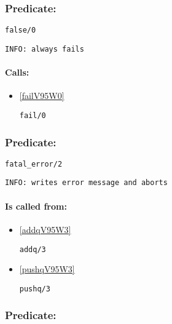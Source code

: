 \subsubsection{Predicate:} \label{falseV95W0}

\begin{verbatim}
false/0
\end{verbatim}

{\small \begin{verbatim}
INFO: always fails

\end{verbatim}}
\paragraph{Calls:} 
\begin{itemize}
\item \ref{failV95W0} 
\begin{verbatim}
fail/0
\end{verbatim}

\end{itemize}

\subsubsection{Predicate:} \label{fatalV95WerrorV95W2}

\begin{verbatim}
fatal_error/2
\end{verbatim}

{\small \begin{verbatim}
INFO: writes error message and aborts

\end{verbatim}}
\paragraph{Is called from:} 
\begin{itemize}
\item \ref{addqV95W3} 
\begin{verbatim}
addq/3
\end{verbatim}

\item \ref{pushqV95W3} 
\begin{verbatim}
pushq/3
\end{verbatim}

\end{itemize}

\subsubsection{Predicate:} \label{fcallV95W3}

